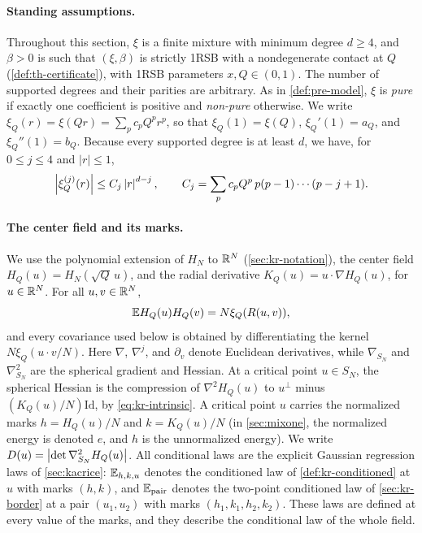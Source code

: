 \paragraph{Standing assumptions.}
Throughout this section, $\xi$ is a finite mixture with minimum degree $d\ge4$, and $\beta>0$ is such that $(\xi,\beta)$ is strictly 1RSB with a nondegenerate contact at $Q$ (\cref{def:th-certificate}), with 1RSB parameters $x,Q\in(0,1)$. The number of supported degrees and their parities are arbitrary. As in \cref{def:pre-model}, $\xi$ is \emph{pure} if exactly one coefficient is positive and \emph{non-pure} otherwise. We write $\xi_Q(r)=\xi(Qr)=\sum_pc_pQ^pr^p$, so that $\xi_Q(1)=\xi(Q)$, $\xi_Q'(1)=a_Q$, and $\xi_Q''(1)=b_Q$. Because every supported degree is at least $d$, we have, for $0\le j\le4$ and $|r|\le1$,
\begin{equation}\label{eq:mp-derivative-orders}
\left|\xi_Q^{(j)}(r)\right|\le C_j\left|r\right|^{d-j},\qquad C_j=\sum_pc_pQ^p\,p(p-1)\cdots(p-j+1).
\end{equation}

\paragraph{The center field and its marks.}
We use the polynomial extension of $H_N$ to $\mathbb R^N$ (\cref{sec:kr-notation}), the center field $H_Q(u)=H_N(\sqrt Q\,u)$, and the radial derivative $K_Q(u)=u\cdot\nabla H_Q(u)$, for $u\in\mathbb R^N$. For all $u,v\in\mathbb R^N$,
\begin{equation}\label{eq:mp-kernel}
\mathbb E H_Q(u)H_Q(v)=N\xi_Q(R(u,v)),
\end{equation}
and every covariance used below is obtained by differentiating the kernel $N\xi_Q(u\cdot v/N)$. Here $\nabla$, $\nabla^j$, and $\partial_v$ denote Euclidean derivatives, while $\nabla_{S_N}$ and $\nabla^2_{S_N}$ are the spherical gradient and Hessian. At a critical point $u\in S_N$, the spherical Hessian is the compression of $\nabla^2H_Q(u)$ to $u^\perp$ minus $(K_Q(u)/N)\mathrm{Id}$, by \eqref{eq:kr-intrinsic}. A critical point $u$ carries the normalized marks $h=H_Q(u)/N$ and $k=K_Q(u)/N$ (in \cref{sec:mixone}, the normalized energy is denoted $e$, and $h$ is the unnormalized energy). We write $D(u)=\left|\det\nabla^2_{S_N}H_Q(u)\right|$. All conditional laws are the explicit Gaussian regression laws of \cref{sec:kacrice}: $\mathbb E_{h,k,u}$ denotes the conditioned law of \cref{def:kr-conditioned} at $u$ with marks $(h,k)$, and $\mathbb E_{\mathrm{pair}}$ denotes the two-point conditioned law of \cref{sec:kr-border} at a pair $(u_1,u_2)$ with marks $(h_1,k_1,h_2,k_2)$. These laws are defined at every value of the marks, and they describe the conditional law of the whole field.

